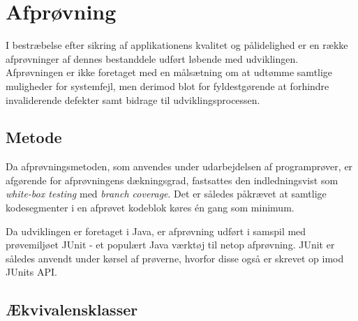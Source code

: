 \documentclass{article}
\begin{document}
	\section{Afprøvning}
	\label{sec:afproevning}
	I bestræbelse efter sikring af applikationens kvalitet og pålidelighed er en række afprøvninger af dennes bestanddele udført løbende med udviklingen. Afprøvningen er ikke foretaget med en målsætning om at udtømme samtlige muligheder for systemfejl, men derimod blot for fyldestgørende at forhindre invaliderende defekter samt bidrage til udviklingsprocessen.

	\subsection{Metode}
	\label{subsec:metode}
	Da afprøvningsmetoden, som anvendes under udarbejdelsen af programprøver, er afgørende for afprøvningens dækningsgrad, fastsattes den indledningsvist som \emph{white-box testing} med \emph{branch coverage}. Det er således påkrævet at samtlige kodesegmenter i en afprøvet kodeblok køres én gang som minimum.
	
	Da udviklingen er foretaget i Java, er afprøvning udført i samspil med prøvemiljøet JUnit - et populært Java værktøj til netop afprøvning. JUnit er således anvendt under kørsel af prøverne, hvorfor disse også er skrevet op imod JUnits API.

	\subsection{Ækvivalensklasser}
	\label{subsec:aekvivalensklasser}
\end{document}
